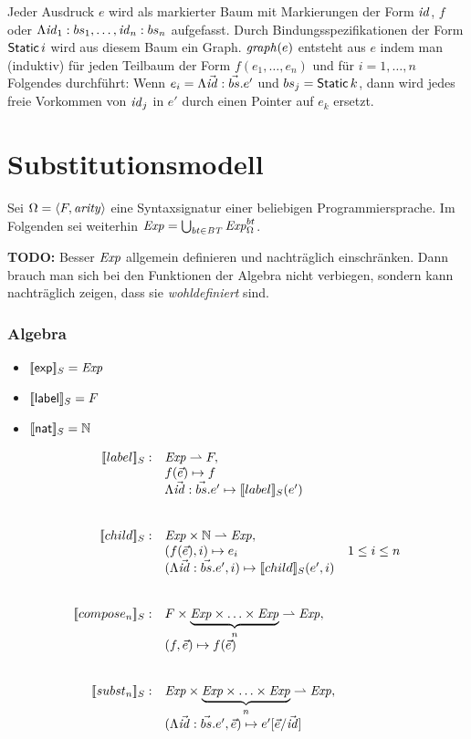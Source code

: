 \documentclass[12pt,a4paper]{article}
\begin{document}
Jeder Ausdruck $e$ wird als markierter Baum mit Markierungen der Form $\mathit{id}$, $f$ oder
$\Lambda \mathit{id}_1:bs_1,\ldots,\mathit{id}_n:bs_n$ aufgefasst. Durch Bindungsspezifikationen der
Form $\mathsf{Static}\,i$ wird aus diesem Baum ein Graph. $\mathit{graph}(e)$ entsteht aus
$e$ indem man (induktiv) f\"ur jeden Teilbaum der Form $f(e_1,\ldots,e_n)$ und
f\"ur $i=1,\ldots,n$ Folgendes durchf\"uhrt: Wenn $e_i = \Lambda \vec{\mathit{id}}:\vec{bs}.e'$
und $bs_j = \mathsf{Static}\,k$, dann wird jedes freie Vorkommen von $\mathit{id}_j$ in $e'$
durch einen Pointer auf $e_k$ ersetzt.


\section*{Substitutionsmodell}

Sei $\Omega=\langle F,\mathit{arity} \rangle$ eine Syntaxsignatur einer beliebigen Programmiersprache.
Im Folgenden sei weiterhin $\mathit{Exp} = \bigcup_{bt\in\mathit{BT}}\mathit{Exp}^{bt}_\Omega$.

\noindent\textbf{TODO:} Besser $\mathit{Exp}$ allgemein definieren und nachtr\"aglich einschr\"anken.
Dann brauch man sich bei den Funktionen der Algebra nicht verbiegen, sondern kann nachtr\"aglich
zeigen, dass sie \emph{wohldefiniert} sind.

\subsubsection*{Algebra}

\begin{itemize}
\item $[\![\mathsf{exp}]\!]_S = \mathit{Exp}$
\item $[\![\mathsf{label}]\!]_S = F$
\item $[\![\mathsf{nat}]\!]_S = \mathbb N$
\end{itemize}

\[\begin{array}{rll}
  \sem{label}_S: & \Exp \pto F, \\
  & f(\vec{e}) \mapsto f \\
  & \Lambda\vec{\id}:\vec{bs}.e' \mapsto \sem{label}_S(e') \\
  \\\\
  \sem{child}_S: & \Exp \times \N \pto \Exp, \\
  & (f(\vec{e}),i) \mapsto e_i & 1 \le i \le n \\
  & (\Lambda\vec{\id}:\vec{bs}.e',i) \mapsto \sem{child}_S(e',i) \\
  \\\\
  \sem{compose_n}_S: & F \times \underbrace{\Exp \times \ldots \times \Exp}_n \pto \Exp, \\
  & (f, \vec{e}) \mapsto f(\vec{e}) \\
  \\\\
  \sem{subst_n}_S: & \Exp \times \underbrace{\Exp \times \ldots \times \Exp}_n \pto \Exp, \\
  & (\Lambda\vec{\id}:\vec{bs}.e',\vec{e}) \mapsto e'[\vec{e}/\vec{\id}]
\end{array}\]
\end{document}
